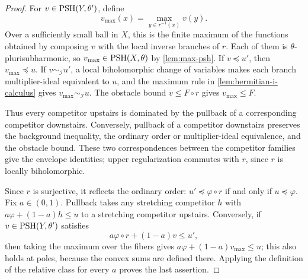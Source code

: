 \begin{proof}
For $v\in\mathrm{PSH}(Y,\theta')$, define
\[
 v_{\max}(x)=\max_{y\in r^{-1}(x)}v(y).
\]
Over a sufficiently small ball in $X$, this is the finite maximum of the functions obtained by composing $v$ with the local inverse branches of $r$. Each of them is $\theta$-plurisubharmonic, so $v_{\max}\in\mathrm{PSH}(X,\theta)$ by \cref{lem:max-psh}. If $v\preceq u'$, then $v_{\max}\preceq u$. If $v\sim_{\mathcal I}u'$, a local biholomorphic change of variables makes each branch multiplier-ideal equivalent to $u$, and the maximum rule in \cref{lem:hermitian-i-calculus} gives $v_{\max}\sim_{\mathcal I}u$. The obstacle bound $v\leq F\circ r$ gives $v_{\max}\leq F$.

Thus every competitor upstairs is dominated by the pullback of a corresponding competitor downstairs. Conversely, pullback of a competitor downstairs preserves the background inequality, the ordinary order or multiplier-ideal equivalence, and the obstacle bound. These two correspondences between the competitor families give the envelope identities; upper regularization commutes with $r$, since $r$ is locally biholomorphic.

Since $r$ is surjective, it reflects the ordinary order: $u'\preceq\varphi\circ r$ if and only if $u\preceq\varphi$. Fix $a\in(0,1)$. Pullback takes any stretching competitor $h$ with $a\varphi+(1-a)h\leq u$ to a stretching competitor upstairs. Conversely, if $v\in\mathrm{PSH}(Y,\theta')$ satisfies
\[
 a\varphi\circ r+(1-a)v\leq u',
\]
then taking the maximum over the fibers gives $a\varphi+(1-a)v_{\max}\leq u$; this also holds at poles, because the convex sums are defined there. Applying the definition of the relative class for every $a$ proves the last assertion.
\end{proof}

